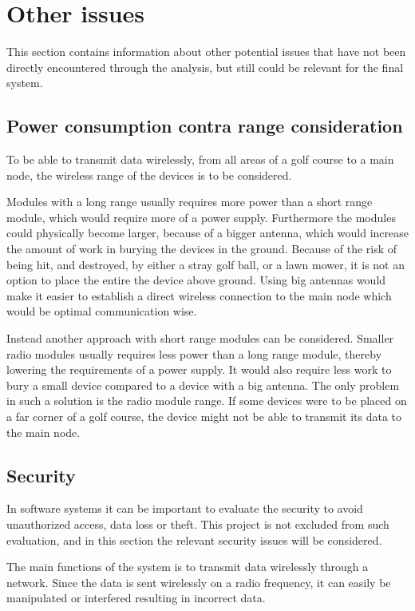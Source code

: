 \section{Other issues}
This section contains information about other potential issues that have not been directly encountered through the analysis, but still could be relevant for the final system.

\subsection{Power consumption contra range consideration} \label{cha:batcons}
To be able to transmit data wirelessly, from all areas of a golf course to a main node, the wireless range of the devices is to be considered.

Modules with a long range usually requires more power than a short range module, which would require more of a power supply. Furthermore the modules could physically become larger, because of a bigger antenna, which would increase the amount of work in burying the devices in the ground. Because of the risk of being hit, and destroyed, by either a stray golf ball, or a lawn mower, it is not an option to place the entire the device above ground. Using big antennas would make it easier to establish a direct wireless connection to the main node which would be optimal communication wise.

Instead another approach with short range modules can be considered. Smaller radio modules usually requires less power than a long range module, thereby lowering the requirements of a power supply. It would also require less work to bury a small device compared to a device with a big antenna. The only problem in such a solution is the radio module range. If some devices were to be placed on a far corner of a golf course, the device might not be able to transmit its data to the main node. 

\subsection{Security}
In software systems it can be important to evaluate the security to avoid unauthorized access, data loss or theft. This project is not excluded from such evaluation, and in this section the relevant security issues will be considered.

The main functions of the system is to transmit data wirelessly through a network. Since the data is sent wirelessly on a radio frequency, it can easily be manipulated or interfered resulting in incorrect data.


